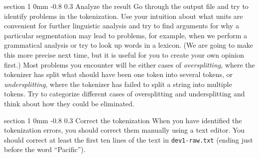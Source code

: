 \documentclass[11pt]{article}
\makeatletter
\newcommand{\newsec}[2]{\section{#1}\label{sec:#2}\noindent}
\renewcommand{\section}{\@startsection
{section}%
{1}%
{0mm}%
{-0.8\baselineskip}%
{0.3\baselineskip}%
{\bfseries\large}}%
\makeatother
\begin{document}
\newsec{Analyze the result}{analyse}%
Go through the output file and try to identify problems in the
tokenization. Use your intuition about what units are convenient for
further linguistic analysis and try to find arguments for why a
particular segmentation may lead to problems, for example, when we
perform a grammatical analysis or try to look up words in a
lexicon. (We are going to make this more precise next time, but it is
useful for you to create your own opinion first.)  Most problems you
encounter will be either cases of \emph{oversplitting}, where the
tokenizer has split what should have been one token into several
tokens, or \emph{undersplitting}, where the tokenizer has failed to
split a string into multiple tokens. Try to categorize different cases
of oversplitting and undersplitting and think about how they could be
eliminated.

\newsec{Correct the tokenization}{correct}%
When you have identified the tokenization errors, you should correct
them manually using a text editor. You should correct at least the
first ten lines of the text in {\tt dev1-raw.txt} (ending just before
the word ``Pacific'').
\end{document}

